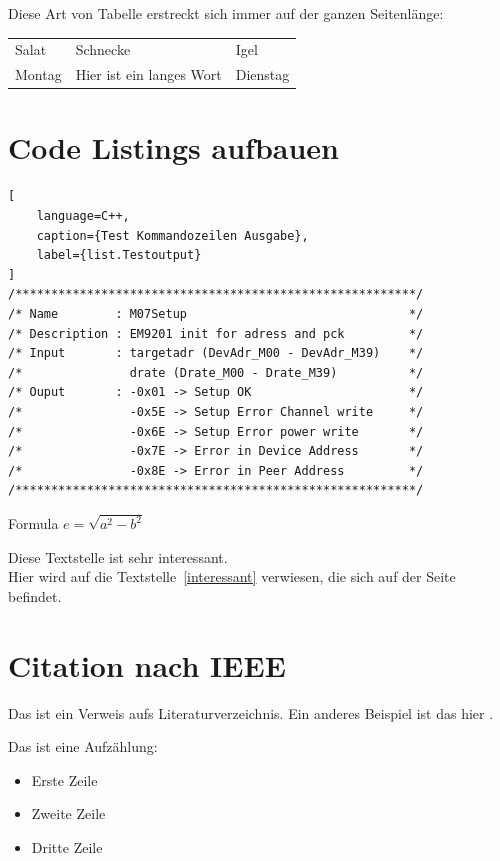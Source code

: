 Diese Art von Tabelle erstreckt sich immer auf der ganzen Seitenlänge:

\begin{tabularx}{\textwidth}{XXl}
  Salat & Schnecke & Igel\\
  Montag & Hier ist ein langes Wort & Dienstag
\end{tabularx}



\section{Code Listings aufbauen}\label{listing}

\begin{lstlisting}[
    language=C++,
    caption={Test Kommandozeilen Ausgabe},
    label={list.Testoutput}
]
/********************************************************/
/* Name        : M07Setup                               */
/* Description : EM9201 init for adress and pck         */
/* Input       : targetadr (DevAdr_M00 - DevAdr_M39)    */
/*               drate (Drate_M00 - Drate_M39)          */
/* Ouput       : -0x01 -> Setup OK                      */
/*               -0x5E -> Setup Error Channel write     */
/*               -0x6E -> Setup Error power write       */
/*               -0x7E -> Error in Device Address       */
/*               -0x8E -> Error in Peer Address         */
/********************************************************/
\end{lstlisting}

Formula $e = \sqrt{a{^2} - b^{2}}$


Diese Textstelle ist sehr interessant.\label{interessant}\\
Hier wird auf die Textstelle~\ref{interessant} verwiesen, die sich auf der Seite~\pageref{interessant} befindet.





\section{Citation nach IEEE}\label{citation}

Das ist ein \cite{microchip_spi} Verweis aufs Literaturverzeichnis. Ein anderes Beispiel ist das hier \cite{randompatterns}.





Das ist eine Aufzählung:
\begin{itemize} %
	\item Erste Zeile
	\item Zweite Zeile
	\item Dritte Zeile
\end{itemize}


